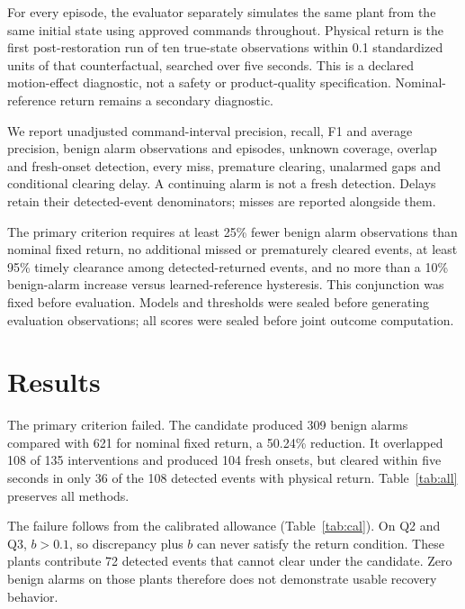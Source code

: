 \documentclass[11pt]{article}
\begin{document}
For every episode, the evaluator separately simulates the same plant from the same initial state using approved commands throughout. Physical return is the first post-restoration run of ten true-state observations within 0.1 standardized units of that counterfactual, searched over five seconds. This is a declared motion-effect diagnostic, not a safety or product-quality specification. Nominal-reference return remains a secondary diagnostic.

We report unadjusted command-interval precision, recall, F1 and average precision, benign alarm observations and episodes, unknown coverage, overlap and fresh-onset detection, every miss, premature clearing, unalarmed gaps and conditional clearing delay. A continuing alarm is not a fresh detection. Delays retain their detected-event denominators; misses are reported alongside them.

The primary criterion requires at least 25\% fewer benign alarm observations than nominal fixed return, no additional missed or prematurely cleared events, at least 95\% timely clearance among detected-returned events, and no more than a 10\% benign-alarm increase versus learned-reference hysteresis. This conjunction was fixed before evaluation. Models and thresholds were sealed before generating evaluation observations; all scores were sealed before joint outcome computation.

\section{Results}
The primary criterion failed. The candidate produced 309 benign alarms compared with 621 for nominal fixed return, a 50.24\% reduction. It overlapped 108 of 135 interventions and produced 104 fresh onsets, but cleared within five seconds in only 36 of the 108 detected events with physical return. Table~\ref{tab:all} preserves all methods.

\begin{table}[htbp]\centering\small
\caption{All methods on the pooled fresh population. Benign counts have denominator 89,100; overlap and fresh counts have denominator 135. Early counts events with premature clearing. Clear/return uses detected events with physical return. CP and matched-entry rows have separate calibration interpretations.}\label{tab:all}

\end{table}

The failure follows from the calibrated allowance (Table~\ref{tab:cal}). On Q2 and Q3, $b>0.1$, so discrepancy plus $b$ can never satisfy the return condition. These plants contribute 72 detected events that cannot clear under the candidate. Zero benign alarms on those plants therefore does not demonstrate usable recovery behavior.
\end{document}
